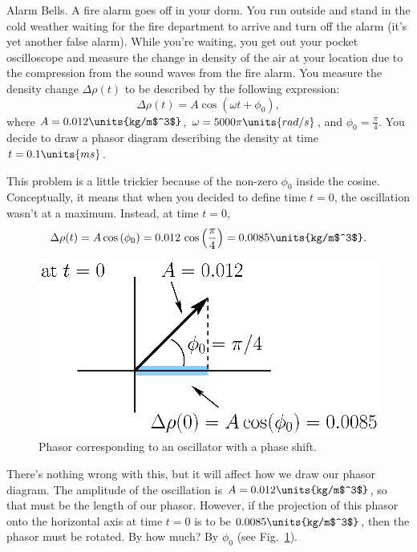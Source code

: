 
\begin{exampleb}{Alarm Bells.} 
\label{example2}
A fire alarm goes off in your dorm. You run outside and stand in the 
cold weather waiting for the fire department to
arrive and turn off the alarm (it's yet another false alarm). While
you're waiting, you get out your pocket oscilloscope and measure the
change in density of the air at your location due to the compression
from the sound waves from the fire alarm. You measure the density
change $\Delta \rho(t)$ to be described by the following expression:
\begin{equation}
\Delta \rho(t) = A\cos{\left(\omega t + \phi_0\right)},
\end{equation} 
where $A = 0.012\units{kg/m$^3$}$, $\omega =5000\pi\units{rad/s}$, 
and $\phi_0 = \frac{\pi}{4}$. You decide to draw a phasor diagram 
describing the density at time $t= 0.1\units{ms}$.
\begin{solution}
This problem is a little trickier because of the non-zero $\phi_0$
inside the cosine. Conceptually, it means that when you decided to
define time $t=0$, the oscillation wasn't at a maximum. Instead, at
time $t=0$,
\begin{equation}
\Delta \rho(t) = A\cos{(\phi_0)} 
                  = 0.012\, \cos{\left(\frac{\pi}{4}\right)}
                  = 0.0085\units{kg/m$^3$}.
\end{equation}
\begin{figure}[b]
\begin{center}
 \includegraphics[width=2.75truein]{phasors/phasor06} 
\caption{\label{fig:phasor06}Phasor corresponding to an oscillator
with a phase shift.}
\end{center}
\end{figure}
There's nothing wrong with this, but it will affect how we draw our
phasor diagram. The amplitude of the oscillation is %
$A = 0.012\units{kg/m$^3$}$, so that must be the length of our phasor.
However, if the projection of this phasor onto the horizontal axis at
time $t = 0$ is to be $0.0085\units{kg/m$^3$}$, then the phasor must
be rotated. By how much? By $\phi_0$ (see Fig.~\ref{fig:phasor06}).


\end{solution}
\end{exampleb}
